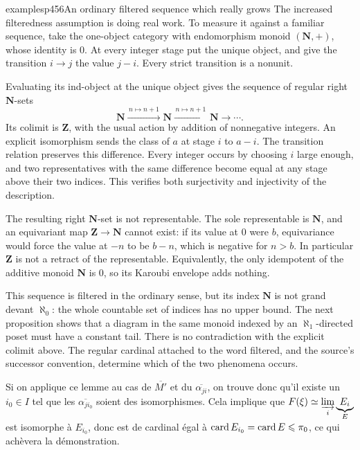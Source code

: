 \begin{dcomment}{examples}{p456}{An ordinary filtered sequence which really grows}
The increased filteredness assumption is doing real work. To measure it against a familiar sequence, take the one-object category with endomorphism monoid $(\mathbf N,+)$, whose identity is $0$. At every integer stage put the unique object, and give the transition $i\to j$ the value $j-i$. Every strict transition is a nonunit.

Evaluating its ind-object at the unique object gives the sequence of regular right $\mathbf N$-sets
\[
\mathbf N\xrightarrow{\,n\mapsto n+1\,}\mathbf N
\xrightarrow{\,n\mapsto n+1\,}\mathbf N\longrightarrow\cdots .
\]
Its colimit is $\mathbf Z$, with the usual action by addition of nonnegative integers. An explicit isomorphism sends the class of $a$ at stage $i$ to $a-i$. The transition relation preserves this difference. Every integer occurs by choosing $i$ large enough, and two representatives with the same difference become equal at any stage above their two indices. This verifies both surjectivity and injectivity of the description.

The resulting right $\mathbf N$-set is not representable. The sole representable is $\mathbf N$, and an equivariant map $\mathbf Z\to\mathbf N$ cannot exist: if its value at $0$ were $b$, equivariance would force the value at $-n$ to be $b-n$, which is negative for $n>b$. In particular $\mathbf Z$ is not a retract of the representable. Equivalently, the only idempotent of the additive monoid $\mathbf N$ is $0$, so its Karoubi envelope adds nothing.

This sequence is filtered in the ordinary sense, but its index $\mathbf N$ is not grand devant $\aleph_0$: the whole countable set of indices has no upper bound. The next proposition shows that a diagram in the same monoid indexed by an $\aleph_1$-directed poset must have a constant tail. There is no contradiction with the explicit colimit above. The regular cardinal attached to the word filtered, and the source's successor convention, determine which of the two phenomena occurs.
\end{dcomment}


Si on applique ce lemme au cas de $\overline{M'}$ et du $\overline{\alpha_{ji}}$, on trouve donc qu'il existe un $i_0 \in I$ tel que les $\overline{\alpha_{ji_0}}$ soient des isomorphismes. Cela implique que $F(\xi) \simeq \varinjlim\limits_{i} \underbrace{E_i}_{E}$ est isomorphe à $E_{i_0}$, donc est de cardinal égal à $\operatorname{card} E_{i_0} = \operatorname{card} E \leqslant \pi_0$, ce qui achèvera la démonstration.

